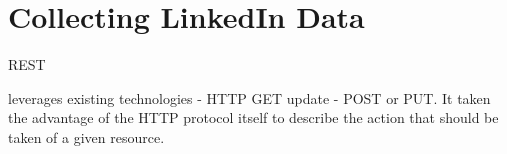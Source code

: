 \documentclass[12pt, oneside, a4paper]{book}
\begin{document}
%
%
%
%
%
%
%
%

\section{Collecting LinkedIn Data}

REST

leverages existing technologies - HTTP GET update - POST or PUT. It taken the advantage of the HTTP protocol itself to describe the action that should be taken of a given resource.
\end{document}
